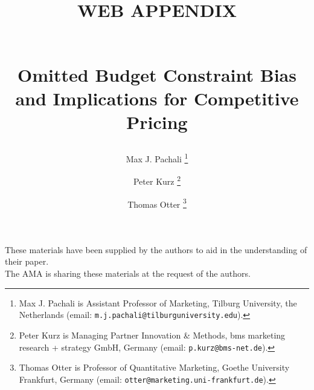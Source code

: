 \documentclass[12pt, a4paper, leqno]{article}
\begin{document}
\renewcommand{\figurename}{Figure W}

\renewcommand{\tablename}{Table W}

\renewcommand{\theequation}{W\arabic{equation}}




\title{
WEB APPENDIX

\\Omitted Budget Constraint Bias and Implications for
Competitive Pricing
}

\author{
Max J. Pachali
\thanks{Max J. Pachali is Assistant Professor of Marketing, Tilburg University, the Netherlands (email: \texttt{m.j.pachali@tilburguniversity.edu}).}
\and 
Peter Kurz 
\thanks{Peter Kurz is Managing Partner Innovation \& Methods, bms marketing research + strategy GmbH, Germany (email: \texttt{p.kurz@bms-net.de}).}
\and
Thomas Otter
\thanks{Thomas Otter is Professor of Quantitative Marketing, Goethe University Frankfurt, Germany (email: \texttt{otter@marketing.uni-frankfurt.de}).}}

\date{}

\maketitle

These materials have been supplied by the authors to aid in the understanding of their paper. \\ The AMA is sharing these materials at the request of the authors.


\thispagestyle{empty}

\newpage
\tableofcontents
\thispagestyle{empty}



\newpage



\newpage
\setcounter{page}{1}

\end{document}
